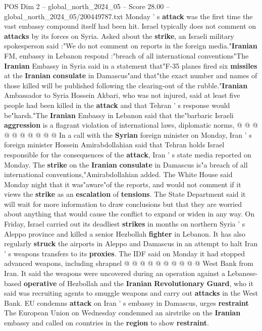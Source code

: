 \begin{textsample}{POS Dim 2 – global\_north\_2024\_05 – Score 28.00 – global\_north\_2024\_05/200449787.txt}
Monday ' s \textbf{attack} was the first time the vast embassy compound itself had been hit.
Israel typically does not comment on \textbf{attacks} by its forces on Syria.
Asked about the \textbf{strike}, an Israeli military spokesperson said :"We do not comment on reports in the foreign media."\textbf{Iranian} FM, embassy in Lebanon respond :"breach of all international conventions"The \textbf{Iranian} Embassy in Syria said in a statement that"F-35 planes fired six \textbf{missiles} at the \textbf{Iranian} \textbf{consulate} in Damascus"and that"the exact number and names of those killed will be published following the clearing-out of the rubble."\textbf{Iranian} Ambassador to Syria Hossein Akbari, who was not injured, said at least five people had been killed in the \textbf{attack} and that Tehran ' s response would be"harsh."The \textbf{Iranian} Embassy in Lebanon said that the"barbaric Israeli \textbf{aggression} is a flagrant violation of international laws, diplomatic norms, @ @ @ @ @ @ @ @ @ @ In a call with the \textbf{Syrian} foreign minister on Monday, Iran ' s foreign minister Hossein Amirabdollahian said that Tehran holds Israel responsible for the consequences of the \textbf{attack}, Iran ' s state media reported on Monday.
The \textbf{strike} on the \textbf{Iranian} \textbf{consulate} in Damascus is"a breach of all international conventions,"Amirabdollahian added.
The White House said Monday night that it was"aware"of the reports, and would not comment if it views the \textbf{strike} as an \textbf{escalation} of \textbf{tensions}.
The State Department said it will wait for more information to draw conclusions but that they are worried about anything that would cause the conflict to expand or widen in any way.
On Friday, Israel carried out its deadliest \textbf{strikes} in months on northern Syria ' s Aleppo province and killed a senior Hezbollah \textbf{fighter} in Lebanon.
It has also regularly \textbf{struck} the airports in Aleppo and Damascus in an attempt to halt Iran ' s weapons transfers to its \textbf{proxies}.
The IDF said on Monday it had stopped advanced weapons, including shrapnel @ @ @ @ @ @ @ @ @ @ West Bank from Iran.
It said the weapons were uncovered during an operation against a Lebanese-based \textbf{operative} of Hezbollah and the \textbf{Iranian} \textbf{Revolutionary} \textbf{Guard}, who it said was recruiting agents to smuggle weapons and carry out \textbf{attacks} in the West Bank.
EU condemns \textbf{attack} on Iran ' s embassy in Damascus, urges \textbf{restraint} The European Union on Wednesday condemned an airstrike on the \textbf{Iranian} embassy and called on countries in the \textbf{region} to show \textbf{restraint}.

\end{textsample}
